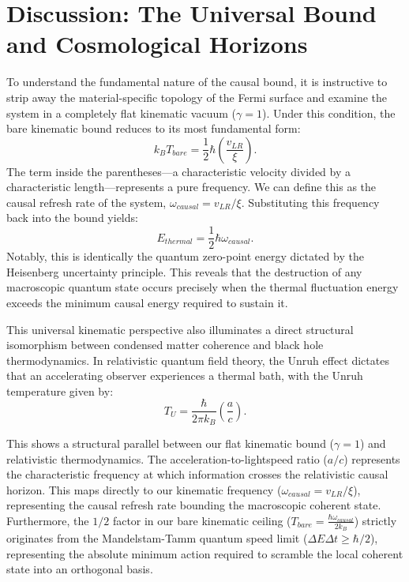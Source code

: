 \documentclass[11pt,a4paper]{article}
\begin{document}
\section*{Discussion: The Universal Bound and Cosmological Horizons}

To understand the fundamental nature of the causal bound, it is instructive to strip away the material-specific topology of the Fermi surface and examine the system in a completely flat kinematic vacuum ($\gamma = 1$). Under this condition, the bare kinematic bound reduces to its most fundamental form:
\begin{equation}
\label{eq:t_bare_original}
k_B T_{bare} = \frac{1}{2} \hbar \left( \frac{v_{LR}}{\xi} \right).
\end{equation}
The term inside the parentheses—a characteristic velocity divided by a characteristic length—represents a pure frequency. We can define this as the causal refresh rate of the system, $\omega_{causal} = v_{LR} / \xi$. Substituting this frequency back into the bound yields:
\begin{equation}
E_{thermal} = \frac{1}{2} \hbar \omega_{causal}.
\end{equation}
Notably, this is identically the quantum zero-point energy dictated by the Heisenberg uncertainty principle. This reveals that the destruction of any macroscopic quantum state occurs precisely when the thermal fluctuation energy exceeds the minimum causal energy required to sustain it.

This universal kinematic perspective also illuminates a direct structural isomorphism between condensed matter coherence and black hole thermodynamics. In relativistic quantum field theory, the Unruh effect dictates that an accelerating observer experiences a thermal bath, with the Unruh temperature given by:
\begin{equation}
T_U = \frac{\hbar}{2\pi k_B} \left( \frac{a}{c} \right).
\end{equation}

This shows a structural parallel between our flat kinematic bound ($\gamma = 1$) and relativistic thermodynamics. The acceleration-to-lightspeed ratio ($a/c$) represents the characteristic frequency at which information crosses the relativistic causal horizon. This maps directly to our kinematic frequency ($\omega_{causal} = v_{LR}/\xi$), representing the causal refresh rate bounding the macroscopic coherent state. Furthermore, the $1/2$ factor in our bare kinematic ceiling ($T_{bare} = \frac{\hbar \omega_{causal}}{2 k_B}$) strictly originates from the Mandelstam-Tamm quantum speed limit ($\Delta E \Delta t \ge \hbar/2$), representing the absolute minimum action required to scramble the local coherent state into an orthogonal basis.
\end{document}
